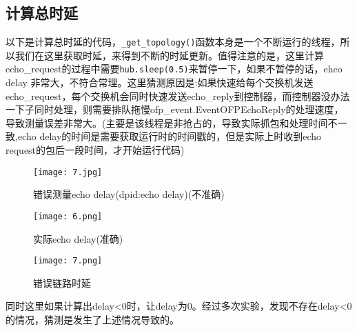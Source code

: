 \documentclass{xjtureport}
\begin{document}
\subsection{计算总时延}
以下是计算总时延的代码，\texttt{\_get\_topology()}函数本身是一个不断运行的线程，所以我们在这里获取时延，来得到不断的时延更新。值得注意的是，这里计算echo\_request的过程中需要\texttt{hub.sleep(0.5)}来暂停一下，如果不暂停的话，ehco delay 非常大，不符合常理。这里猜测原因是:如果快速给每个交换机发送echo\_request，每个交换机会同时快速发送echo\_reply到控制器，而控制器没办法一下子同时处理，则需要排队拖慢ofp\_event.EventOFPEchoReply的处理速度，导致测量误差非常大。(主要是该线程是非抢占的，导致实际抓包和处理时间不一致,echo delay的时间是需要获取运行时的时间戳的，但是实际上时收到echo request的包后一段时间，才开始运行代码)
\begin{figure}[H]
	\centering
	\texttt{[image: 7.jpg]}
	\caption{错误测量echo delay(dpid:echo delay)(不准确)}
\end{figure}
\begin{figure}[H]
	\centering
	\texttt{[image: 6.png]}
	\caption{实际echo delay(准确)}
\end{figure}
\begin{figure}[H]
	\centering
	\texttt{[image: 7.png]}
	\caption{错误链路时延}
\end{figure}
同时这里如果计算出delay<0时，让delay为0。经过多次实验，发现不存在delay<0的情况，猜测是发生了上述情况导致的。
\end{document}
